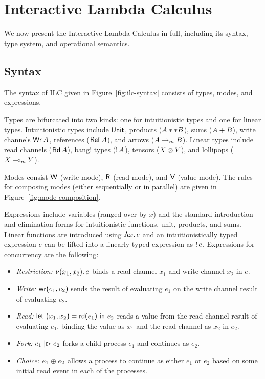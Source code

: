 \section{Interactive Lambda Calculus}
\label{sec:ilc}

We now present the Interactive Lambda Calculus in full, including its syntax,
type system, and operational semantics.

\subsection{Syntax}
\label{subsec:syntax}



The syntax of ILC given in Figure~\ref{fig:ilc-syntax} consists of types, modes,
and expressions.

Types are bifurcated into two kinds: one for intuitionistic types and one for
linear types. Intuitionistic types include $\text{\textsf{Unit}}$, products
(${A} ** {B}$), sums (${A} + {B}$), write channels $\text{\textsf{Wr}}\,A$, references
($\text{\textsf{Ref}}\,A$), and arrows (${A}\rightarrow_{\footnotesize m}{B}$). Linear types
include read channels ($\text{\textsf{Rd}}\,A$), bang! types (${!}\,{A}$), tensors
(${X}\otimes{Y}$), and lollipops (${X}\multimap_{\footnotesize m}{Y}$).

Modes consist $\textsf{W}$ (write mode), $\textsf{R}$ (read mode), and $\textsf{V}$ (value mode). The
rules for composing modes (either sequentially or in parallel) are given in
Figure~\ref{fig:mode-composition}.

Expressions include variables (ranged over by $x$) and the standard introduction
and elimination forms for intuitionistic functions, unit, products, and
sums.  Linear functions are introduced using
$\Lambda{x}.\,{e}$ and an intuitionistically typed expression $e$ can be lifted into
a linearly typed expression as ${!}\,{e}$. 
Expressions for concurrency are the following:
\begin{itemize}[leftmargin=*]
  \item \emph{Restriction:} $\nu(x_1, x_2).\,e$ binds a read channel $x_1$ and
    write channel $x_2$ in $e$.
  \item \emph{Write:} $\text{\textsf{wr}}\textsf{(}{e_1},{e_2}\textsf{)}$ sends the result of evaluating $e_1$ on
    the write channel result of evaluating $e_2$.
  \item \emph{Read:} $\text{\textsf{let}}\ {\textsf{(}{x_1},{x_2}\textsf{)}} = {\text{\textsf{rd}}\textsf{(}{e_1}\textsf{)}}\ \text{\textsf{in}}\ {{e_2}}$ reads a value from the read
    channel result of evaluating $e_1$, binding the value as $x_1$ and the read
    channel as $x_2$ in $e_2$.
  \item \emph{Fork:} $e_1 \mathrel{|\rhd} e_2$ forks a child process $e_1$ and
    continues as $e_2$.
  \item \emph{Choice:} $e_1 \mathrel{\oplus} e_2$ allows a process to continue as
    either $e_1$ or $e_2$ based on some initial read event in each of the
    processes.
\end{itemize}

